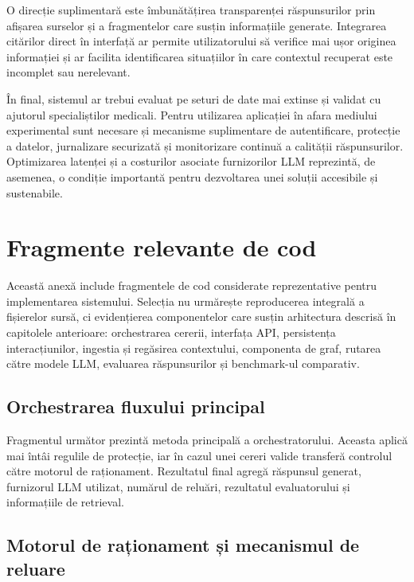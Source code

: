 \documentclass[12pt, a4paper, oneside, romanian]{teza-upb}
\begin{document}
O direcție suplimentară este îmbunătățirea transparenței răspunsurilor prin afișarea surselor și a fragmentelor care susțin informațiile generate. Integrarea citărilor direct în interfață ar permite utilizatorului să verifice mai ușor originea informației și ar facilita identificarea situațiilor în care contextul recuperat este incomplet sau nerelevant.

În final, sistemul ar trebui evaluat pe seturi de date mai extinse și validat cu ajutorul specialiștilor medicali. Pentru utilizarea aplicației în afara mediului experimental sunt necesare și mecanisme suplimentare de autentificare, protecție a datelor, jurnalizare securizată și monitorizare continuă a calității răspunsurilor. Optimizarea latenței și a costurilor asociate furnizorilor LLM reprezintă, de asemenea, o condiție importantă pentru dezvoltarea unei soluții accesibile și sustenabile.




\appendix
\chapter{Fragmente relevante de cod}

Această anexă include fragmentele de cod considerate reprezentative pentru implementarea sistemului. Selecția nu urmărește reproducerea integrală a fișierelor sursă, ci evidențierea componentelor care susțin arhitectura descrisă în capitolele anterioare: orchestrarea cererii, interfața API, persistența interacțiunilor, ingestia și regăsirea contextului, componenta de graf, rutarea către modele LLM, evaluarea răspunsurilor și benchmark-ul comparativ.

\section{Orchestrarea fluxului principal}

Fragmentul următor prezintă metoda principală a orchestratorului. Aceasta aplică mai întâi regulile de protecție, iar în cazul unei cereri valide transferă controlul către motorul de raționament. Rezultatul final agregă răspunsul generat, furnizorul LLM utilizat, numărul de reluări, rezultatul evaluatorului și informațiile de retrieval.

\label{anexa:orchestrator-flow}


\section{Motorul de raționament și mecanismul de reluare}
\end{document}
